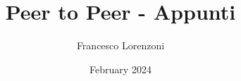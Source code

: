 

\title{Peer to Peer - Appunti}
\author{Francesco Lorenzoni}
\date{February 2024}



\maketitle
\tableofcontents








